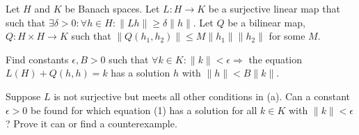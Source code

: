 Let $H$ and $K$ be Banach spaces. Let $L:H\rightarrow K$ be a
surjective linear map that such that $\exists \delta>0:\forall h\in
H:\|Lh\|\geq \delta \|h\|$. Let $Q$ be a bilinear map, $Q:H\times
H\rightarrow K$ such that $\|Q(h_1,h_2)\|\leq M\|h_1\|\|h_2\|$ for
some $M$.
\begin{alist}
\item Find constants $\epsilon,B>0$ such that $\forall k\in
K:\|k\|<\epsilon\Rightarrow$ the equation $L(H)+Q(h,h)=k$ has a
solution $h$ with $\|h\|<B\|k\|$.
\item Suppose $L$ is not surjective but meets all other conditions in
(a). Can a constant $\epsilon>0$ be found for which equation (1) has a
solution for all $k\in K$ with $\|k\|<\epsilon$? Prove it can or find
a counterexample.
\end{alist}
